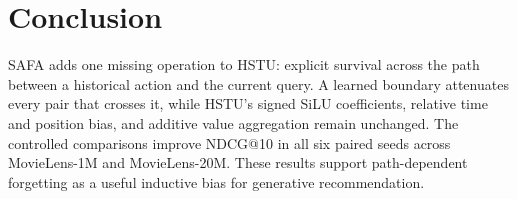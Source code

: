 \documentclass[11pt,letterpaper,logo]{yalearxiv}
\begin{document}
\section{Conclusion}

SAFA adds one missing operation to HSTU: explicit survival across the path
between a historical action and the current query.  A learned boundary
attenuates every pair that crosses it, while HSTU's signed SiLU coefficients,
relative time and position bias, and additive value aggregation remain
unchanged.  The controlled comparisons improve NDCG@10 in all six paired seeds
across MovieLens-1M and MovieLens-20M.  These results support path-dependent
forgetting as a useful inductive bias for generative recommendation.




\end{document}
